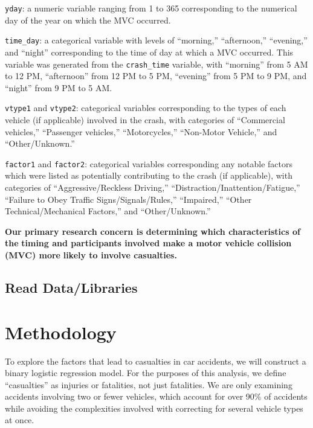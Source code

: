 \documentclass[
  letterpaper,
  DIV=11,
  numbers=noendperiod]{scrartcl}
\begin{document}
\texttt{yday}: a numeric variable ranging from 1 to 365 corresponding to
the numerical day of the year on which the MVC occurred.

\texttt{time\_day}: a categorical variable with levels of ``morning,''
``afternoon,'' ``evening,'' and ``night'' corresponding to the time of
day at which a MVC occurred. This variable was generated from the
\texttt{crash\_time} variable, with ``morning'' from 5 AM to 12 PM,
``afternoon'' from 12 PM to 5 PM, ``evening'' from 5 PM to 9 PM, and
``night'' from 9 PM to 5 AM.

\texttt{vtype1} and \texttt{vtype2}: categorical variables corresponding
to the types of each vehicle (if applicable) involved in the crash, with
categories of ``Commercial vehicles,'' ``Passenger vehicles,''
``Motorcycles,'' ``Non-Motor Vehicle,'' and ``Other/Unknown.''

\texttt{factor1} and \texttt{factor2}: categorical variables
corresponding any notable factors which were listed as potentially
contributing to the crash (if applicable), with categories of
``Aggressive/Reckless Driving,'' ``Distraction/Inattention/Fatigue,''
``Failure to Obey Traffic Signs/Signals/Rules,'' ``Impaired,'' ``Other
Technical/Mechanical Factors,'' and ``Other/Unknown.''

\textbf{Our primary research concern is determining which
characteristics of the} \textbf{timing and participants involved make a
motor vehicle collision (MVC) more} \textbf{likely to involve
casualties.}

\hypertarget{read-datalibraries}{%
\subsection{Read Data/Libraries}\label{read-datalibraries}}

\hypertarget{methodology}{%
\section{Methodology}\label{methodology}}

To explore the factors that lead to casualties in car accidents, we will
construct a binary logistic regression model. For the purposes of this
analysis, we define ``casualties'' as injuries or fatalities, not just
fatalities. We are only examining accidents involving two or fewer
vehicles, which account for over 90\% of accidents while avoiding the
complexities involved with correcting for several vehicle types at once.
\end{document}
